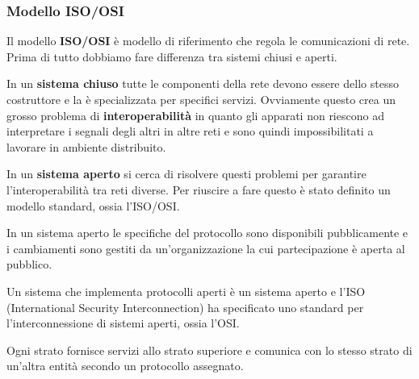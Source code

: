 \subsubsection{Modello ISO/OSI}
Il modello \textbf{ISO/OSI} è modello di riferimento che regola le comunicazioni di rete. Prima di
tutto dobbiamo fare differenza tra sistemi chiusi e aperti.

In un \textbf{sistema chiuso} tutte le componenti della rete devono essere dello stesso costruttore
e la è specializzata per specifici servizi. Ovviamente questo crea un grosso problema di
\textbf{interoperabilità} in quanto gli apparati non riescono ad interpretare i segnali degli altri
in altre reti e sono quindi impossibilitati a lavorare in ambiente distribuito.

In un \textbf{sistema aperto} si cerca di risolvere questi problemi per garantire 
l'interoperabilità tra reti diverse. Per riuscire a fare questo è stato definito un modello
standard, ossia l'ISO/OSI.

In un sistema aperto le specifiche del protocollo sono disponibili pubblicamente e i cambiamenti 
sono gestiti da un'organizzazione la cui partecipazione è aperta al pubblico.

Un sistema che implementa protocolli aperti è un sistema aperto e l'ISO (International Security
Interconnection) ha specificato uno standard per l'interconnessione di sistemi aperti, ossia l'OSI.

Ogni strato fornisce servizi allo strato superiore e comunica con lo stesso strato di un'altra 
entità secondo un protocollo assegnato.


